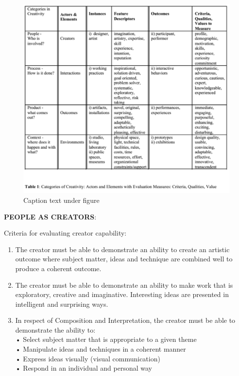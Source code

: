 \begin{figure}[!htb] %
  \centering
    \includegraphics{images/mmcetable.png}
  \caption[Text for Table of Contents]{Caption text under figure}
  \label{fig:mmcet}
\end{figure}

\textbf{PEOPLE AS CREATORS}: \citep[p.14-15]{Candy2012}

Criteria for evaluating creator capability:
\begin{enumerate}
\item The creator must be able to demonstrate an ability to create an artistic outcome where subject matter, ideas and technique are combined well to produce a coherent outcome.
\item The creator must be able to demonstrate an ability to make work that is exploratory, creative and imaginative. Interesting ideas are presented in intelligent and surprising ways.
\item In respect of Composition and Interpretation, the creator must be able to demonstrate the ability to:\\
•	Select subject matter that is appropriate to a given theme\\
•	Manipulate ideas and techniques in a coherent manner\\
•	Express ideas visually (visual communication)\\
•	Respond in an individual and personal way
\end{enumerate}

